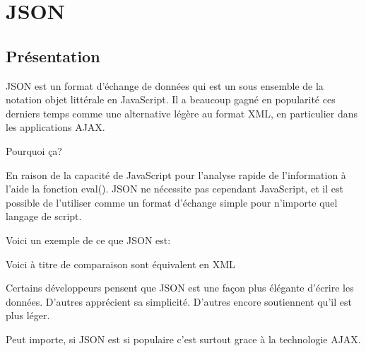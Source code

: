 \section{JSON}
\label{ch:json}

\subsection{Présentation}


JSON est un format d’échange de données qui est un sous ensemble de la notation objet littérale en JavaScript. Il a beaucoup gagné en popularité ces derniers temps comme une alternative légère au format XML, en particulier dans les applications AJAX.

Pourquoi ça?

En raison de la capacité de JavaScript pour l’analyse rapide de l’information à l’aide la fonction eval(). JSON ne nécessite pas cependant JavaScript, et il est possible de l’utiliser comme un format d’échange simple pour n’importe quel langage de script.

Voici un exemple de ce que JSON est:



Voici à titre de comparaison sont équivalent en XML





Certains développeurs pensent que JSON est une façon plus élégante d’écrire les données. D’autres apprécient sa simplicité. D’autres encore soutiennent qu’il est plus léger.

Peut importe, si JSON est si populaire c’est surtout grace à la technologie AJAX.

